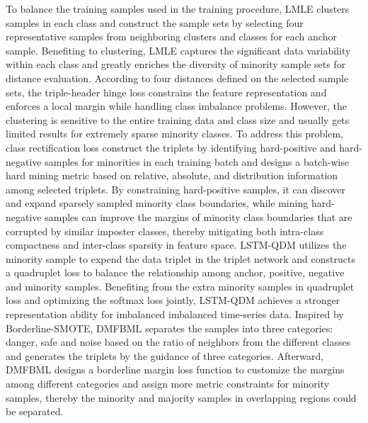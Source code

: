 To balance the training samples used in the training procedure, LMLE \cite{huang2016learning} clusters samples in each class and construct the sample sets by selecting four representative samples from neighboring clusters and classes for each anchor sample. Benefiting to clustering, LMLE captures the significant data variability within each class and greatly enriches the diversity of minority sample sets for distance evaluation. According to four distances defined on the selected sample sets, the triple-header hinge loss constrains the feature representation and enforces a local margin while handling class imbalance problems. 
However, the clustering is sensitive to the entire training data and class size and usually gets limited results for extremely sparse minority classes. 
To address this problem, class rectification loss \cite{dong2017class} construct the triplets by identifying hard-positive and hard-negative samples for minorities in each training batch and designs a batch-wise hard mining metric based on relative, absolute, and distribution information among selected triplets. By constraining hard-positive samples, it can discover and expand sparsely sampled minority class boundaries, while mining hard-negative samples can improve the margins of minority class boundaries that are corrupted by similar imposter classes, thereby mitigating both intra-class compactness and inter-class sparsity in feature space.
LSTM-QDM \cite{gui2022quadruplet} utilizes the minority sample to expend the data triplet in the triplet network \cite{cheng2016person} and constructs a quadruplet loss to balance the relationship among anchor, positive, negative and minority samples. Benefiting from the extra minority samples in quadruplet loss and optimizing the softmax loss jointly, LSTM-QDM achieves a stronger representation ability for imbalanced imbalanced time-series data.
Inspired by Borderline-SMOTE, DMFBML \cite{yan2023borderline} separates the samples into three categories: danger, safe and noise based on the ratio of neighbors from the different classes and generates the triplets by the guidance of three categories. Afterward, DMFBML designs a borderline margin loss function to customize the margins among different categories and assign more metric constraints for minority samples, thereby the minority and majority samples in overlapping regions could be separated.


